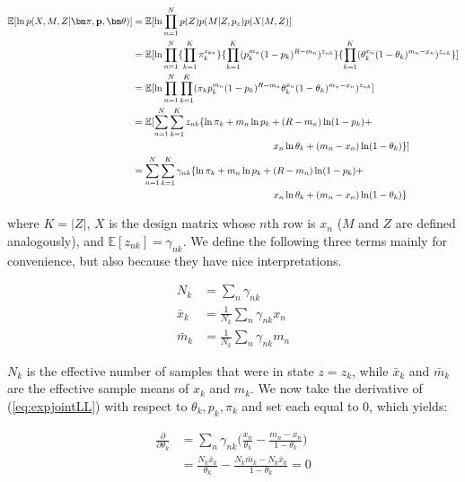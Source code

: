 \documentclass[a4paper]{article}
\newcommand{\vp}{{\bf p}}
\newcommand{\vpi}{{\bm \pi}}
\newcommand{\vtheta}{{\bm \theta}}
\newcommand{\E}{\mathbb{E}}
\begin{document}
\begin{align}
\E [ \ln p(X, M , Z | \vpi, \vp, \vtheta) ] &= \E [ \ln \prod_{n = 1}^{N}  p(Z) p(M | Z, p_{z} ) p(X | M, Z ) ] \nonumber \\
							&= \E [ \ln \prod_{n = 1}^{N} \{ \prod_{k = 1}^{K} \pi_k^{z_{kn}} \} \{ \prod_{k = 1}^{K} ( p_k^{m_n} (1-p_k)^{R - m_n} ) ^{z_{nk}} \} \{ \prod_{k = 1}^{K} ( \theta_k^{x_n} (1 - \theta_k)^{m_n - x_n} )^{z_{nk}} \} ] \notag \\
							&= \E [ \ln \prod_{n = 1}^{N} \prod_{k = 1}^{K} ( \pi_k  p_{k}^{m_n} (1-p_k)^{R - m_n} \theta_k^{x_n} (1 - \theta_k)^{m_n - x_n} )^{z_{nk}} ]  \nonumber \\
							&= \E [ \sum_{n = 1}^{N} \sum_{k = 1}^{K} z_{nk} \{ \ln \pi_k  + m_n \ln p_k + (R - m_n) \ln (1-p_k) + \notag \\
							&\phantom{---------------} x_n \ln \theta_k + (m_n - x_n) \ln (1 - \theta_k) \} ]  \nonumber \\
							&= \sum_{n = 1}^{N} \sum_{k = 1}^{K} \gamma_{nk} \{ \ln \pi_k  + m_n \ln p_k + (R - m_n) \ln (1-p_k) + \notag \\
						    &\phantom{---------------} x_n \ln \theta_k + (m_n - x_n) \ln (1 - \theta_k) \label{eq:expjointLL} \}
\end{align} 

where $K = |Z|$, $X$ is the design matrix whose $n$th row is $x_n$ ($M$ and $Z$ are defined analogously), and $\E [ z_{nk} ] = \gamma_{nk}$. We define the following three terms mainly for convenience, but also because they have nice interpretations.

\begin{align}
N_k      &= \sum_n \gamma_{nk} \label{eq:nk} \\
\bar{x}_k  &= \frac{1}{N_k} \sum_n \gamma_{nk} x_n \label{eq:xbar} \\
\bar{m}_k &= \frac{1}{N_k} \sum_n \gamma_{nk} m_n \label{eq:mbar}
\end{align}

$N_k$ is the effective number of samples that were in state $z = z_k$, while $\bar{x}_k$ and $\bar{m}_k$ are the effective sample means of $x_k$ and $m_k$. We now take the derivative of (\ref{eq:expjointLL}) with respect to $\theta_k, p_k, \pi_k$ and set each equal to 0, which yields:

\begin{align}
\frac{\partial}{\partial \theta_k} &= \sum_n \gamma_{nk} \Big( \frac{ x_n}{\theta_k} - \frac{m_n - x_n}{1- \theta_k} \Big)\\
					      &= \frac{N_k \bar{x}_k}{\theta_k} - \frac{N_k \bar{m}_k - N_k \bar{x}_k}{1- \theta_k} = 0
\end{align}
\end{document}
